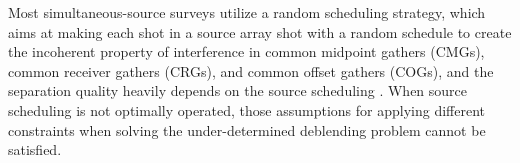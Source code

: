 
Most simultaneous-source surveys utilize a random scheduling strategy, which aims at making each shot in a source array shot with a random schedule to create the incoherent property of interference in common midpoint gathers (CMGs), common receiver gathers (CRGs), and common offset gathers (COGs), and the separation quality heavily depends on the source scheduling \cite{abma2014,yangkang2015dbortho}. When source scheduling is not optimally operated, those assumptions for applying different constraints when solving the under-determined deblending problem cannot be satisfied.

